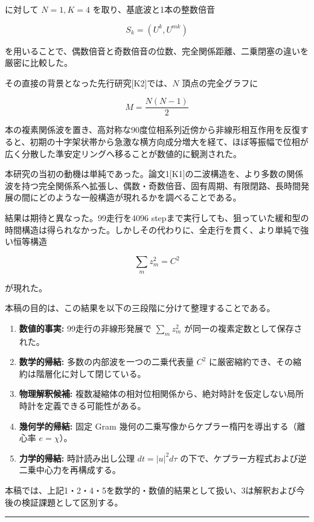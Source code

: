 \documentclass[
  a4paper,
]{ltjsarticle}
\providecommand{\tightlist}{%
  \setlength{\itemsep}{0pt}\setlength{\parskip}{0pt}}
\begin{document}
に対して \(N=1,K=4\) を取り、基底波と1本の整数倍音

\[
S_k=(U^k,U^{mk})
\]

を用いることで、偶数倍音と奇数倍音の位数、完全関係距離、二乗閉塞の違いを厳密に比較した。

その直接の背景となった先行研究{[}K2{]}では、\(N\) 頂点の完全グラフに

\[
M=\frac{N(N-1)}{2}
\]

本の複素関係波を置き、高対称な90度位相系列近傍から非線形相互作用を反復すると、初期の十字架状帯から急激な横方向成分増大を経て、ほぼ等振幅で位相が広く分散した準安定リングへ移ることが数値的に観測された。

本研究の当初の動機は単純であった。論文1{[}K1{]}の二波構造を、より多数の関係波を持つ完全関係系へ拡張し、偶数・奇数倍音、固有周期、有限閉路、長時間発展の間にどのような一般構造が現れるかを調べることである。

結果は期待と異なった。99走行を4096
stepまで実行しても、狙っていた緩和型の時間構造は得られなかった。しかしその代わりに、全走行を貫く、より単純で強い恒等構造

\[
\boxed{\sum_m z_m^2=C^2}
\]

が現れた。

本稿の目的は、この結果を以下の三段階に分けて整理することである。

\begin{enumerate}
\def\labelenumi{\arabic{enumi}.}
\tightlist
\item
  \textbf{数値的事実:} 99走行の非線形発展で \(\sum_m z_m^2\)
  が同一の複素定数として保存された。
\item
  \textbf{数学的帰結:} 多数の内部波を一つの二乗代表量 \(C^2\)
  に厳密縮約でき、その縮約は階層化に対して閉じている。
\item
  \textbf{物理解釈候補:}
  複数凝縮体の相対位相関係から、絶対時計を仮定しない局所時計を定義できる可能性がある。
\item
  \textbf{幾何学的帰結:} 固定 Gram
  幾何の二乗写像からケプラー楕円を導出する（離心率 \(e=\chi\)）。
\item
  \textbf{力学的帰結:} 時計読み出し公理 \(dt=|u|^2d\tau\)
  の下で、ケプラー方程式および逆二乗中心力を再構成する。
\end{enumerate}

本稿では、上記1・2・4・5を数学的・数値的結果として扱い、3は解釈および今後の検証課題として区別する。

\begin{center}\rule{0.5\linewidth}{0.5pt}\end{center}
\end{document}
